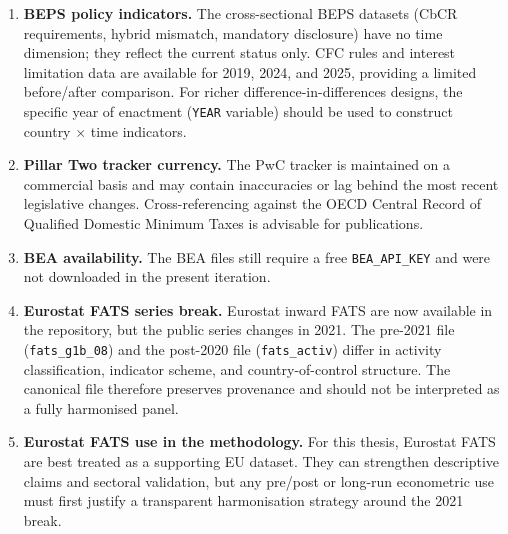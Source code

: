 \documentclass[11pt,a4paper]{article}
\begin{document}
\begin{enumerate}
    \item \textbf{BEPS policy indicators.}  The cross-sectional BEPS datasets
    (CbCR requirements, hybrid mismatch, mandatory disclosure) have no
    time dimension; they reflect the current status only.  CFC rules and
    interest limitation data are available for 2019, 2024, and 2025, providing
    a limited before/after comparison.  For richer difference-in-differences
    designs, the specific year of enactment (\texttt{YEAR} variable) should be
    used to construct country $\times$ time indicators.

    \item \textbf{Pillar Two tracker currency.}  The PwC tracker is maintained on
    a commercial basis and may contain inaccuracies or lag behind the most
    recent legislative changes.  Cross-referencing against the OECD Central
    Record of Qualified Domestic Minimum Taxes is advisable for publications.

    \item \textbf{BEA availability.}  The BEA files still require a free
    \texttt{BEA\_API\_KEY} and were not downloaded in the present iteration.

    \item \textbf{Eurostat FATS series break.}  Eurostat inward FATS are now
    available in the repository, but the public series changes in 2021.  The
    pre-2021 file (\texttt{fats\_g1b\_08}) and the post-2020 file
    (\texttt{fats\_activ}) differ in activity classification, indicator scheme,
    and country-of-control structure.  The canonical file therefore preserves
    provenance and should not be interpreted as a fully harmonised panel.

    \item \textbf{Eurostat FATS use in the methodology.}  For this thesis,
    Eurostat FATS are best treated as a supporting EU dataset.  They can
    strengthen descriptive claims and sectoral validation, but any pre/post or
    long-run econometric use must first justify a transparent harmonisation
    strategy around the 2021 break.

\end{enumerate}
\end{document}
